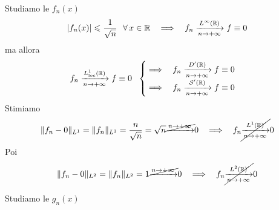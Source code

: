 Studiamo le $f_{n}( x)$
\begin{equation*}
| f_{n}( x)| \leqslant \frac{1}{\sqrt{n}} \ \ \forall x\in \RR  \ \ \implies \ \ f_{n}\xrightarrow[n\rightarrow +\infty ]{L^{\infty }(\RR )} f\equiv 0
\end{equation*}
ma allora
\begin{equation*}
f_{n}\xrightarrow[n\rightarrow +\infty ]{L^{1}_{\operatorname{loc}}(\mathbb{R} )} f\equiv 0\ \ \begin{cases}
\implies \ \ f_{n}\xrightarrow[n\rightarrow +\infty ]{D'(\mathbb{R} )} f\equiv 0\\
\implies \ \ f_{n}\xrightarrow[n\rightarrow +\infty ]{\mathcal{S}  '(\mathbb{R} )} f\equiv 0
\end{cases}
\end{equation*}
Stimiamo
\begin{equation*}
\Vert f_{n} -0\Vert _{L^{1}} =\Vert f_{n}\Vert _{L^{1}} =\frac{n}{\sqrt{n}} =\sqrt{n}\cancel{\xrightarrow{n\rightarrow +\infty }} 0\ \ \implies \ \ f_{n}\cancel{\xrightarrow[n\rightarrow +\infty ]{L^{1}(\RR )}} 0
\end{equation*}
Poi
\begin{equation*}
\Vert f_{n} -0\Vert _{L^{2}} =\Vert f_{n}\Vert _{L^{2}} =1\cancel{\xrightarrow{n\rightarrow +\infty }} 0\ \ \implies \ \ f_{n}\cancel{\xrightarrow[n\rightarrow +\infty ]{L^{2}(\mathbb{R} )}} 0
\end{equation*}


Studiamo le $g_{n}( x)$

